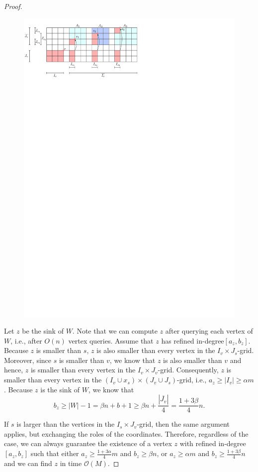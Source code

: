 \documentclass[a4paper,10pt]{article}
\newcommand{\indegree}{refined in-degree\xspace}
\begin{document}
\begin{proof}
\begin{figure}[h]
\centering
\includegraphics{expansion_lemma_fig1.pdf}
\caption{\small }
\label{fig:expansion}
\end{figure}

Let $z$ be the sink of $W$. Note that we can compute $z$ after querying each vertex of $W$, i.e., after $O(n)$ vertex queries. Assume that $z$ has \indegree $[a_z, b_z]$. 
Because $z$ is smaller than $s$, $z$ is also smaller than every vertex in the $I_v\times J_{s}$-grid. Moreover, since $s$ is smaller than $v$, we know that $z$ is also smaller than $v$ and hence, $z$ is smaller than every vertex in the $I_v\times J_v$-grid.
Consequently, $z$ is smaller than every vertex in the $(I_v\cup x_s)\times (J_v\cup J_{s})$-grid, i.e., $a_z\geq |I_v| \geq \alpha m$.
Because $z$ is the sink of $W$, we know that
 $$b_z \geq |W| - 1 = \beta n + b + 1 \geq  \beta n + \frac{|\overline{J_v}|}{4} = \frac{1 + 3\beta}{4}n.$$

If $s$ is larger than the vertices in the $I_{s}\times J_v$-grid, then the same argument applies, but exchanging the roles of the coordinates. Therefore, regardless of the case, we can always guarantee the existence of a vertex $z$ with \indegree $[a_z,b_z]$ such that either $a_z\geq \frac{1+3\alpha}{4}m$ and $b_z \geq \beta n$, or $a_z \geq \alpha m$ and $b_z \geq \frac{1 + 3\beta}{4}n$ and we can find $z$ in time $\mathcal{O}(M)$.
\end{proof}
\end{document}
